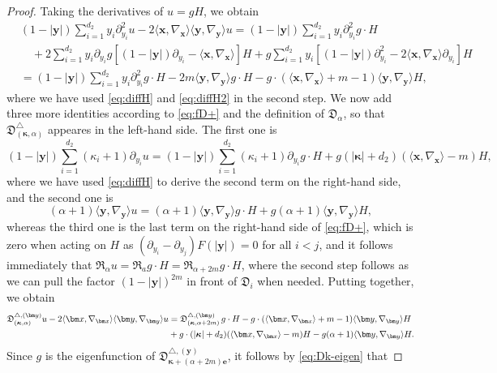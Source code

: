 \documentclass{amsart}
\theoremstyle{remark}
\def\la{{\langle}}
\def\ra{{\rangle}}
\def\fD{{\mathfrak D}}
\def\fR{{\mathfrak R}}
\def\a{{\alpha}}
\def\k{{\kappa}}
\def\la{{\langle}}
\def\ra{{\rangle}}
\def\yb{{\bm y}}
\def\bk{{\boldsymbol{\kappa}}}
\begin{document}
\begin{proof}
Taking the derivatives of $u = g H$, we obtain 
\begin{align*}
 &  (1-|\bm y|) \sum_{i=1}^{d_2} y_i  \partial_{y_i}^2 u - 2 \la \bm x, \nabla_{\bm x} \ra  \la \bm y, \nabla_{\bm y} \ra u 
  = (1-|\bm y|) \sum_{i=1}^{d_2} y_i  \partial_{y_i}^2 g \cdot H \\
   & \quad + 2 \sum_{i=1}^{d_2} y_i \partial_{y_i} g  \left[ (1-|\bm y|) \partial_{y_i} 
    -  \la \bm x, \nabla_{\bm x} \ra\right] H 
      + g \sum_{i=1}^{d_2} y_i  \left[ (1-|\bm y|) \partial_{y_i}^2 - 2 \la \bm x, \nabla_{\bm x}\ra  \partial_{y_i}\right] H \\
     &  =(1-|\bm y|) \sum_{i=1}^{d_2} y_i  \partial_{y_i}^2 g \cdot H  - 2 m \la \bm y, \nabla_{\bm y} \ra g \cdot H
     - g \cdot (\la \bm x, \nabla_{\bm x}\ra +m-1) \la \bm y, \nabla_{\bm y}\ra  H,
\end{align*}
where we have used \eqref{eq:diffH} and \eqref{eq:diffH2} in the second step. We now add three more identities
according to \eqref{eq:fD+} and the definition of $\fD_\a$,  so that $\fD_{(\bk,\a)}^\triangle$ appeares in the 
left-hand side. The first one is 
$$
(1-|\bm y |)  \sum_{i=1}^{d_2} (\k_i +1) \partial_{y_i} u = 
(1-|\bm y |)  \sum_{i=1}^{d_2} (\k_i +1) \partial_{y_i} g \cdot H + g (|\bk|+ d_2) (\la \bm x, \nabla_{\bm x} \ra -m)H,
$$
where we have used \eqref{eq:diffH} to derive the second term on the right-hand side, and the second one is 
$$
(\a +1) \la \bm y, \nabla_{\bm y} \ra u = (\a +1)  \la \bm y, \nabla_{\bm y} \ra g \cdot H + g (\a +1) \la \bm y, \nabla_{\bm y} \ra H,
$$
whereas the third one is the last term on the right-hand side of \eqref{eq:fD+}, which is zero when acting on $H$ as 
$(\partial_{y_i} -\partial_{y_j})F(|\bm y|) = 0$ for all $i< j$, and it follows immediately that 
$\fR_\a u = \fR_a g\cdot H = \fR_{\a+2m} g \cdot H$, where the second step follows as we can pull the factor $(1-|\bm y|)^{2m}$
in front of $\fD_i$ when needed. Putting together, we obtain
\begin{align*}
\fD_{(\bk,\a)}^{\triangle, (\yb)} u  -  2 \la \bm x, \nabla_{\bm x} \ra  \la \bm y, \nabla_{\bm y} \ra u 
  & =  \fD_{(\bk, \a + 2m)}^{\triangle, (\yb)} \, g \cdot H  - g \cdot (\la \bm x, \nabla_{\bm x}\ra +m-1) \la \bm y, \nabla_{\bm y}\ra  H\notag \\
 & + g\cdot (|\bk|+ d_2) (\la \bm x, \nabla_{\bm x} \ra -m)H - g (\a +1) \la \bm y, \nabla_{\bm y} \ra H. 
\end{align*}
Since $g$ is the eigenfunction of $\fD_{\bk + (\a + 2m) \bm e}^{\triangle, (\yb)}$, it follows by \eqref{eq:Dk-eigen} that 

\end{proof}
\end{document}
